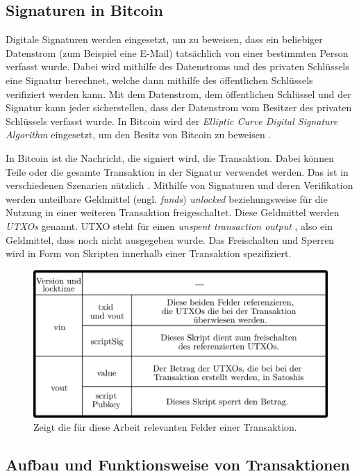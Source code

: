 \documentclass[ngerman,runningheads,a4paper]{llncs}[2018/03/10]
\begin{document}
\subsection{Signaturen in Bitcoin}

Digitale Signaturen werden eingesetzt, um zu beweisen, dass ein beliebiger Datenstrom (zum Beispiel eine E-Mail) tatsächlich von einer bestimmten Person verfasst wurde. Dabei wird mithilfe des Datenstroms und des privaten Schlüssels eine Signatur berechnet, welche dann mithilfe des öffentlichen Schlüssels verifiziert werden kann. Mit dem Datenstrom, dem öffentlichen Schlüssel und der Signatur kann jeder sicherstellen, dass der Datenstrom vom Besitzer des privaten Schlüssels verfasst wurde. In Bitcoin wird der \textit{Elliptic Curve Digital Signature Algorithm} eingesetzt, um den Besitz von Bitcoin zu beweisen \citep{bitcoinbook}.

In Bitcoin ist die Nachricht, die signiert wird, die Transaktion. Dabei können Teile oder die gesamte Transaktion in der Signatur verwendet werden. Das ist in verschiedenen Szenarien nützlich \citep{bitcoinbook}. Mithilfe von Signaturen und deren Verifikation werden unteilbare Geldmittel (engl. \textit{funds}) \textit{unlocked} beziehungsweise für die Nutzung in einer weiteren Transaktion freigeschaltet. Diese Geldmittel werden \textit{UTXOs} genannt. UTXO steht für einen \textit{unspent transaction output} \citep{bitcoinbook}, also ein Geldmittel, dass noch nicht ausgegeben wurde. Das Freischalten und Sperren wird in Form von Skripten innerhalb einer Transaktion spezifiziert.

\begin{figure}
  \centering
  \includegraphics[width=.8\textwidth]{grafiken/tableTransaction.png}
  \caption{Zeigt die für diese Arbeit relevanten Felder einer Transaktion.}
  \label{fig:transactionTable}
\end{figure}

\subsection{Aufbau und Funktionsweise von Transaktionen}
\end{document}
